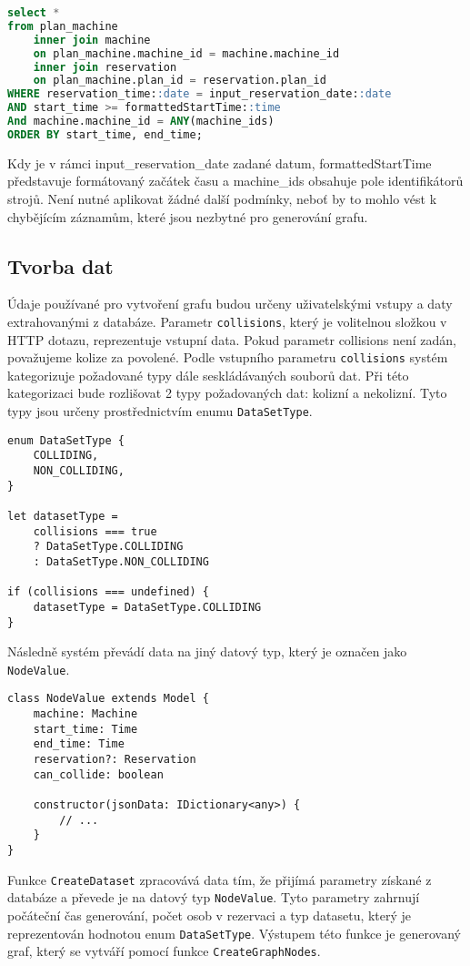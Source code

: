 \begin{lstlisting}[language=SQL]
select * 
from plan_machine 
    inner join machine 
	on plan_machine.machine_id = machine.machine_id
    inner join reservation
	on plan_machine.plan_id = reservation.plan_id
WHERE reservation_time::date = input_reservation_date::date
AND start_time >= formattedStartTime::time
And machine.machine_id = ANY(machine_ids)
ORDER BY start_time, end_time;
\end{lstlisting}
Kdy je v rámci input\_reservation\_date zadané datum, formattedStartTime představuje formátovaný začátek času a machine\_ids obsahuje pole identifikátorů strojů. Není nutné aplikovat žádné další podmínky, neboť by to mohlo vést k chybějícím záznamům, které jsou nezbytné pro generování grafu.

\subsection{Tvorba dat}
Údaje používané pro vytvoření grafu budou určeny uživatelskými vstupy a daty extrahovanými z databáze. Parametr \texttt{collisions}, který je volitelnou složkou v HTTP dotazu, reprezentuje vstupní data. Pokud parametr collisions není zadán, považujeme kolize za povolené. Podle vstupního parametru \texttt{collisions} systém kategorizuje požadované typy dále seskládávaných souborů dat. Při této kategorizaci bude rozlišovat 2 typy požadovaných dat: kolizní a nekolizní. Tyto typy jsou určeny prostřednictvím enumu \texttt{DataSetType}.

\begin{lstlisting}
enum DataSetType {
    COLLIDING,
    NON_COLLIDING,
}

let datasetType =
    collisions === true
	? DataSetType.COLLIDING
	: DataSetType.NON_COLLIDING

if (collisions === undefined) {
    datasetType = DataSetType.COLLIDING
}
\end{lstlisting}

Následně systém převádí data na jiný datový typ, který je označen jako \texttt{NodeValue}.

\begin{lstlisting}
class NodeValue extends Model {
    machine: Machine
    start_time: Time
    end_time: Time
    reservation?: Reservation
    can_collide: boolean

    constructor(jsonData: IDictionary<any>) {
	    // ...
    }
}
\end{lstlisting}

Funkce \texttt{CreateDataset} zpracovává data tím, že přijímá parametry získané z databáze a převede je na datový typ \texttt{NodeValue}. Tyto parametry zahrnují počáteční čas generování, počet osob v rezervaci a typ datasetu, který je reprezentován hodnotou enum \texttt{DataSetType}. Výstupem této funkce je generovaný graf, který se vytváří pomocí funkce \texttt{CreateGraphNodes}.

